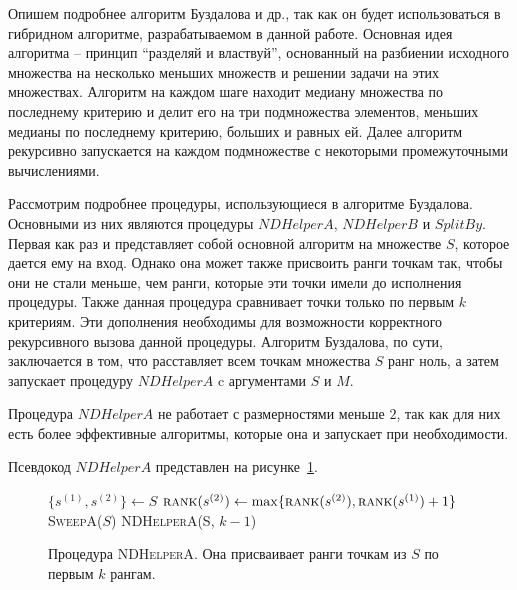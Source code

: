 Опишем подробнее алгоритм Буздалова и др., так как он будет использоваться в гибридном алгоритме, разрабатываемом в данной работе.
Основная идея алгоритма -- принцип ``разделяй и властвуй'', основанный на разбиении исходного множества на несколько меньших
множеств и решении задачи на этих множествах. Алгоритм на каждом шаге находит медиану множества по последнему критерию и делит
его на три подмножества элементов, меньших медианы по последнему критерию, больших и равных ей. Далее алгоритм рекурсивно запускается
на каждом подмножестве с некоторыми промежуточными вычислениями.

Рассмотрим подробнее процедуры, использующиеся в алгоритме Буздалова. Основными из них являются процедуры $NDHelperA$, $NDHelperB$ и 
$SplitBy$. Первая как раз и представляет собой основной алгоритм на множестве $S$, которое дается ему на вход. Однако она может также
присвоить ранги точкам так, чтобы они не стали меньше, чем ранги, которые эти точки имели до исполнения процедуры. Также данная процедура
сравнивает точки только по первым $k$ критериям. Эти дополнения необходимы для возможности корректного рекурсивного вызова данной 
процедуры. Алгоритм Буздалова, по сути, заключается в том, что расставляет всем точкам множества $S$ ранг ноль, а затем запускает 
процедуру $NDHelperA$ c аргументами $S$ и $M$.

Процедура $NDHelperA$ не работает с размерностями меньше $2$, так как для них есть более эффективные алгоритмы, которые она и запускает
при необходимости.

Псевдокод $NDHelperA$ представлен на рисунке~\ref{nd-helper-a}.

\begin{figure}
\begin{algorithmic}[1]
     \Return
        \State $\{s^{(1)}, s^{(2)}\} \gets S$
            \State $\textsc{rank}(s^{(2)}) \gets \max\{\textsc{rank}(s^{(2)}), \textsc{rank}(s^{(1)})+1\}$
        \EndIf
        \State \textsc{SweepA}($S$)
        \State \textsc{NDHelperA}(S, $k - 1$)
    \Else
        \State{}
        \State{}
        \State{}
        \State{}
        \State{}
        \State{}
    \EndIf
\EndProcedure
\end{algorithmic}
\caption{Процедура \textsc{NDHelperA}. Она присваивает ранги точкам из $S$ по первым $k$ рангам.}
\label{nd-helper-a}
\end{figure}

